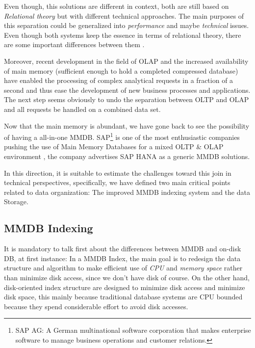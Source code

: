 \documentclass[12pt]{article} %
\begin{document}
    Even though, this solutions are different in context, both are still based on \emph{ Relational theory } but with different technical approaches. The main purposes of this separation could be generalized into \emph{ performance } and maybe \emph{technical} issues. Even though both systems keep the essence in terms of relational theory, there are some important differences between them \cite{Plattner}.

    Moreover, recent development in the field of OLAP and the increased availability of main memory (sufficient enough to hold a completed compressed database) have enabled the processing of complex analytical requests in a fraction of a second and thus ease the development of new business processes and applications. The next step seems obviously to undo the separation between OLTP and OLAP and all requests be handled on a combined data set.


    Now that the main memory is abundant, we have gone back to see the possibility of having a all-in-one MMDB. SAP\footnote{SAP AG: A German multinational software corporation that makes enterprise software to manage business operations and customer relations.} is one of the most enthusiastic companies pushing the use of Main Memory Databases for a mixed OLTP \& OLAP environment \cite{Plattner}, the company advertises SAP HANA as a generic MMDB solutions. 
    
    In this direction, it is suitable to estimate the challenges toward this join in technical perspectives, specifically, we have defined two main critical points related to data organization: The improved MMDB indexing system and the data Storage.

    
\subsection{MMDB Indexing}
It is mandatory to talk first about the differences between MMDB and on-disk DB, at first instance: In a MMDB Index, the main goal is to redesign the data structure and algorithm to make efficient use of \emph{ CPU } and \emph{ memory space } rather than minimize disk access, since we don't have disk of course. On the other hand, disk-oriented index structure are designed to minimize disk access and minimize disk space, this mainly because traditional database systems are CPU bounded because they spend considerable effort to avoid disk accesses.
\end{document}
